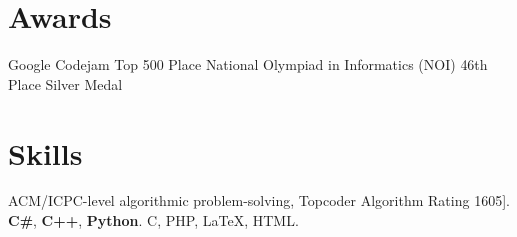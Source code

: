 \documentclass[10pt,a4paper,roman]{moderncv} %
\begin{document}
\section{Awards}
        {Google Codejam}
        {Top 500 Place}
        {}{}{}
        {National Olympiad in Informatics (NOI)}
        {46th Place}
        {Silver Medal}
        {}{}

\section{Skills}
       {ACM/ICPC-level algorithmic problem-solving, Topcoder Algorithm Rating 1605]{}.}
       {\textbf{C\#}, \textbf{C++}, \textbf{Python}.\newline{}%
        C, PHP, \LaTeX, HTML.}
\end{document}
